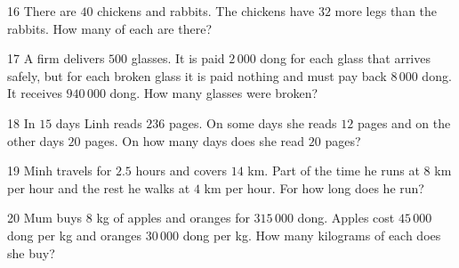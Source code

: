 \gap
\begin{probbox}{16}{\relax}
There are $40$ chickens and rabbits. The chickens have $32$ more legs than the rabbits. How many of each are there?
\end{probbox}
\gap
\begin{probbox}{17}{\relax}
A firm delivers $500$ glasses. It is paid $2\,000$ dong for each glass that arrives safely, but for each broken glass it is paid nothing and must pay back $8\,000$ dong. It receives $940\,000$ dong. How many glasses were broken?
\end{probbox}
\gap
\begin{probbox}{18}{\relax}
In $15$ days Linh reads $236$ pages. On some days she reads $12$ pages and on the other days $20$ pages. On how many days does she read $20$ pages?
\end{probbox}
\gap
\begin{probbox}{19}{\relax}
Minh travels for $2.5$ hours and covers $14$ km. Part of the time he runs at $8$ km per hour and the rest he walks at $4$ km per hour. For how long does he run?
\end{probbox}
\gap
\begin{probbox}{20}{\relax}
Mum buys $8$ kg of apples and oranges for $315\,000$ dong. Apples cost $45\,000$ dong per kg and oranges $30\,000$ dong per kg. How many kilograms of each does she buy?
\end{probbox}
